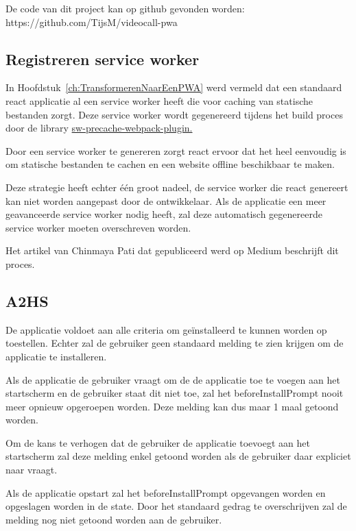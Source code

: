 	De code van dit project kan op github gevonden worden: https://github.com/TijsM/videocall-pwa
	
	\subsection{Registreren service worker}
		
		In Hoofdstuk~\ref{ch:TransformerenNaarEenPWA} werd vermeld dat een standaard react applicatie al een service worker heeft die voor caching van statische bestanden zorgt. Deze service worker wordt gegenereerd tijdens het build proces door de library \href{https://github.com/goldhand/sw-precache-webpack-plugin}{sw-precache-webpack-plugin. }  
		\autocite{Mester2019}
		
		Door een service worker te genereren zorgt react ervoor dat het heel eenvoudig is om statische bestanden te cachen en een website offline beschikbaar te maken.
		
		Deze strategie heeft echter één groot nadeel, de service worker die react genereert kan niet worden aangepast door de ontwikkelaar. Als de applicatie een meer geavanceerde service worker nodig heeft, zal deze automatisch gegenereerde service worker moeten overschreven worden.
		
		Het artikel van Chinmaya Pati dat gepubliceerd werd op Medium beschrijft dit proces. \autocite{Pati2019}
		
	\subsection{A2HS}
	
		De applicatie voldoet aan alle criteria om geïnstalleerd te kunnen worden op toestellen. Echter zal de gebruiker geen standaard melding te zien krijgen om de applicatie te installeren.		
		
		Als de applicatie de gebruiker vraagt om de de applicatie toe te voegen aan het startscherm en de gebruiker staat dit niet toe, zal het beforeInstallPrompt nooit meer opnieuw opgeroepen worden. Deze melding kan dus maar 1 maal getoond worden.
		
		Om de kans te verhogen dat de gebruiker de applicatie toevoegt aan het startscherm zal deze melding enkel getoond worden als de gebruiker daar expliciet naar vraagt.
		\autocite{Mclachlan2020}
		
		Als de applicatie opstart zal het beforeInstallPrompt opgevangen worden en opgeslagen worden in de state. Door het standaard gedrag te overschrijven zal de melding nog niet getoond worden aan de gebruiker.
		\autocite{LePage2020b}
		
